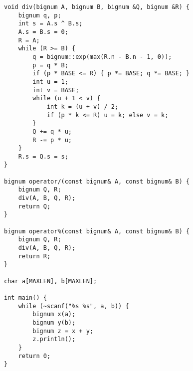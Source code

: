 \begin{verbatim}
void div(bignum A, bignum B, bignum &Q, bignum &R) {
    bignum q, p;
    int s = A.s ^ B.s;
    A.s = B.s = 0;
    R = A;
    while (R >= B) {
        q = bignum::exp(max(R.n - B.n - 1, 0));
        p = q * B;
        if (p * BASE <= R) { p *= BASE; q *= BASE; }
        int u = 1;
        int v = BASE;
        while (u + 1 < v) {
            int k = (u + v) / 2;
            if (p * k <= R) u = k; else v = k;
        }
        Q += q * u;
        R -= p * u;
    }
    R.s = Q.s = s;
}

bignum operator/(const bignum& A, const bignum& B) {
    bignum Q, R;
    div(A, B, Q, R);
    return Q;
}

bignum operator%(const bignum& A, const bignum& B) {
    bignum Q, R;
    div(A, B, Q, R);
    return R;
}

char a[MAXLEN], b[MAXLEN];

int main() {
    while (~scanf("%s %s", a, b)) {
        bignum x(a);
        bignum y(b);
        bignum z = x + y;
        z.println();
    }
    return 0;
}
\end{verbatim}
